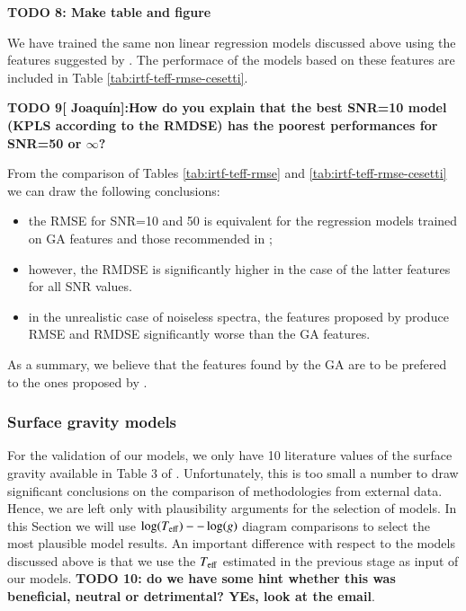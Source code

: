 {\bf TODO 8: Make table and figure}


We have trained the same non linear regression models discussed above
using the features suggested by \cite{cesetti}. The performace of the
models based on these features are included in Table
\ref{tab:irtf-teff-rmse-cesetti}.

{\bf TODO 9[ Joaquín]:How do you explain that the best SNR=10 model
  (KPLS according to the RMDSE) has the poorest performances for
  SNR=50 or $\infty$?} 

From the comparison of Tables \ref{tab:irtf-teff-rmse} and
\ref{tab:irtf-teff-rmse-cesetti} we can draw the following conclusions:

\begin{itemize}
\item the RMSE for SNR=10 and 50 is equivalent for the regression
  models trained on GA features and those recommended in
  \cite{cesetti};
  \item however, the RMDSE is significantly higher in the case of the
    latter features for all SNR values.
    \item in the unrealistic case of noiseless spectra, the features
      proposed by \cite{cesetti} produce RMSE and RMDSE significantly
      worse than the GA features.
\end{itemize}

As a summary, we believe that the features found by the GA are to be
prefered to the ones proposed by \cite{cesetti}.

\subsubsection{Surface gravity models}

For the validation of our models, we only have 10 literature values of
the surface gravity available in Table 3 of
\cite{cesetti}. Unfortunately, this is too small a number to draw
significant conclusions on the comparison of methodologies from
external data. Hence, we are left only with plausibility arguments for
the selection of models. In this Section we will use $\log(T_{\rm
eff})--\log(g)$ diagram comparisons to select the most plausible model
results. An important difference with respect to the models discussed
above is that we use the $T_{\rm eff}$ estimated in the previous stage
as input of our models. {\bf TODO 10: do we have some hint whether
this was beneficial, neutral or detrimental? YEs, look at the email}.

